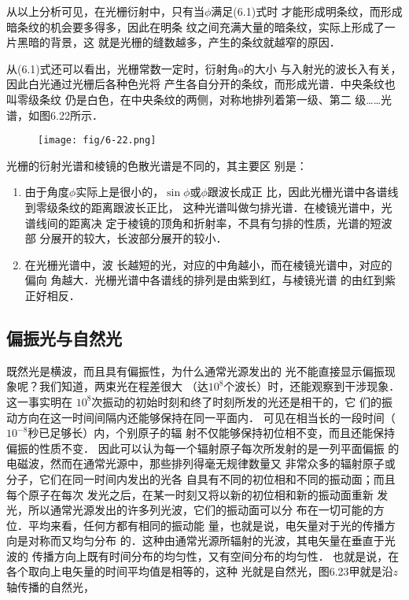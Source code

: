 从以上分析可见，在光栅衍射中，只有当$\phi$满足(6.1)式时
才能形成明条纹，而形成暗条纹的机会要多得多，因此在明条
纹之间充满大量的暗条纹，实际上形成了一片黑暗的背景，这
就是光栅的缝数越多，产生的条纹就越窄的原因．

从(6.1)式还可以看出，光栅常数一定时，衍射角ø的大小
与入射光的波长入有关，因此白光通过光栅后各种色光将
产生各自分开的条纹，而形成光谱．中央条纹也叫零级条纹
仍是白色，在中央条纹的两侧，对称地排列着第一级、第二
级……光谱，如图6.22所示．

\begin{figure}[htp]
    \centering
     \texttt{[image: fig/6-22.png]}
    \caption{}
\end{figure}

光栅的衍射光谱和棱镜的色散光谱是不同的，其主要区
别是：
\begin{enumerate}
\item 由于角度$\phi$实际上是很小的，$\sin\phi$或$\phi$跟波长成正
比，因此光栅光谱中各谱线到零级条纹的距离跟波长正比，
这种光谱叫做匀排光谱．在棱镜光谱中，光谱线间的距离决
定于棱镜的顶角和折射率，不具有匀排的性质，光谱的短波部
分展开的较大，长波部分展开的较小．
\item 在光栅光谱中，波
长越短的光，对应的中角越小，而在棱镜光谱中，对应的偏向
角越大．光栅光谱中各谱线的排列是由紫到红，与棱镜光谱
的由红到紫正好相反．
\end{enumerate}

\subsection{偏振光与自然光}
既然光是横波，而且具有偏振性，为什么通常光源发出的
光不能直接显示偏振现象呢？我们知道，两束光在程差很大
（达$10^{8}$个波长）时，还能观察到干涉现象．这一事实明在
$10^{8}$次振动的初始时刻和终了时刻所发的光还是相干的，它
们的振动方向在这一时间间隔内还能够保持在同一平面内．
可见在相当长的一段时间（$10^{-8}$秒已足够长）内，个别原子的辐
射不仅能够保持初位相不变，而且还能保持偏振的性质不变．
因此可以认为每一个辐射原子每次所发射的是一列平面偏振
的电磁波，然而在通常光源中，那些排列得毫无规律数量又
非常众多的辐射原子或分子，它们在同一时间内发出的光各
自具有不同的初位相和不同的振动面；而且每个原子在每次
发光之后，在某一时刻又将以新的初位相和新的振动面重新
发光，所以通常光源发出的许多列光波，它们的振动面可以分
布在一切可能的方位．平均来看，任何方都有相同的振动能
量，也就是说，电矢量对于光的传播方向是对称而又均匀分布
的．这种由通常光源所辐射的光波，其电矢量在垂直于光波的
传播方向上既有时间分布的均匀性，又有空间分布的均匀性．
也就是说，在各个取向上电矢量的时间平均值是相等的，这种
光就是自然光，图6.23甲就是沿$z$轴传播的自然光，

